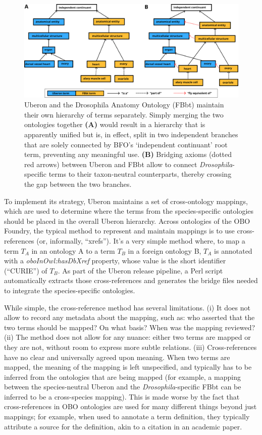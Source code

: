 \documentclass{ceurart}
\def\species#1{\textit{#1}}
\def\term#1{`#1'}
\def\property#1{\textit{#1}}
\begin{document}
\begin{figure}
  \centering
  \includegraphics[width=\linewidth]{figs/bridges}
  \caption{Uberon and the Drosophila Anatomy Ontology (FBbt) maintain
  their own hierarchy of terms separately. Simply merging the two
  ontologies together \textbf{(A)} would result in a hierarchy that is
  apparently unified but is, in effect, split in two independent
  branches that are solely connected by BFO's \term{independent
  continuant} root term, preventing any meaningful use. \textbf{(B)}
  Bridging axioms (dotted red arrows) between Uberon and FBbt allow to
  connect \species{Drosophila}-specific terms to their taxon-neutral
  counterparts, thereby crossing the gap between the two branches.}
  \label{fig:bridges}
\end{figure}

To implement its strategy, Uberon maintains a set of cross-ontology
mappings, which are used to determine where the terms from the
species-specific ontologies should be placed in the overall Uberon
hierarchy. Across ontologies of the OBO Foundry, the typical method to
represent and maintain mappings is to use cross-references (or,
informally, ``xrefs''). It’s a very simple method where, to map a term
$T_A$ in an ontology A to a term $T_B$ in a foreign ontology B, $T_A$ is
annotated with a \property{oboInOwl:hasDbXref} property, whose value is
the short identifier (``CURIE'') of $T_B$. As part of the Uberon release
pipeline, a Perl script automatically extracts those cross-references
and generates the bridge files needed to integrate the species-specific
ontologies.

While simple, the cross-reference method has several limitations. (i) It
does not allow to record any metadata about the mapping, such as: who
asserted that the two terms should be mapped? On what basis? When was
the mapping reviewed? (ii) The method does not allow for any nuance:
either two terms are mapped or they are not, without room to express
more subtle relations. (iii) Cross-references have no clear and
universally agreed upon meaning. When two terms are mapped, the meaning
of the mapping is left unspecified, and typically has to be inferred
from the ontologies that are being mapped (for example, a mapping
between the species-neutral Uberon and the \species{Drosophila}-specific
FBbt can be inferred to be a cross-species mapping). This is made worse
by the fact that cross-references in OBO ontologies are used for many
different things beyond just mappings; for example, when used to
annotate a term definition, they typically attribute a source for the
definition, akin to a citation in an academic paper.
\end{document}
